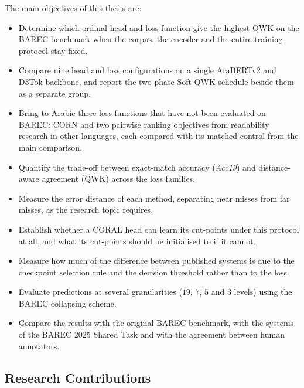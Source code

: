 The main objectives of this thesis are:
\begin{itemize}
\item Determine which ordinal head and loss function give the highest QWK on the BAREC benchmark
when the corpus, the encoder and the entire training protocol stay fixed.
\item Compare nine head and loss configurations on a single AraBERTv2 and D3Tok backbone, and
report the two-phase Soft-QWK schedule beside them as a separate group.
\item Bring to Arabic three loss functions that have not been evaluated on BAREC: CORN and two
pairwise ranking objectives from readability research in other languages, each compared with
its matched control from the main comparison.
\item Quantify the trade-off between exact-match accuracy (\textit{Acc19}) and distance-aware
agreement (QWK) across the loss families.
\item Measure the error distance of each method, separating near misses from far misses, as the
research topic requires.
\item Establish whether a CORAL head can learn its cut-points under this protocol at all, and
what its cut-points should be initialised to if it cannot.
\item Measure how much of the difference between published systems is due to the checkpoint
selection rule and the decision threshold rather than to the loss.
\item Evaluate predictions at several granularities ($19$, $7$, $5$ and $3$ levels) using the
BAREC collapsing scheme.
\item Compare the results with the original BAREC benchmark, with the systems of the BAREC 2025
Shared Task and with the agreement between human annotators.
\end{itemize}

\subsection{Research Contributions}

